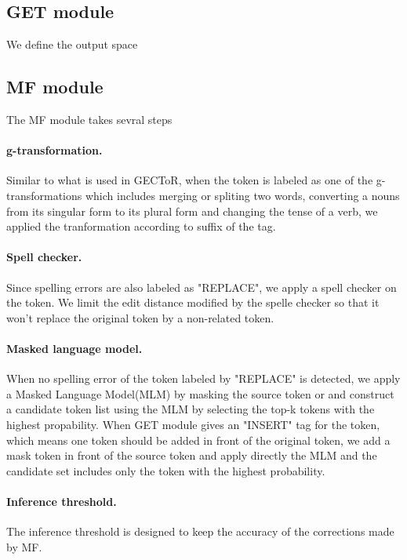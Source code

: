 \subsection{GET module} \label{sec:get_module}


We define the output space 
\subsection{MF module} \label{sec:mf_module}

The MF module takes sevral steps

\paragraph{g-transformation. } Similar to what is used in GECToR, when the token is labeled as one of the g-transformations which includes merging or spliting two words, converting a nouns from its singular form to its plural form and changing the tense of a verb, we applied the tranformation according to suffix of the tag.

\paragraph{Spell checker. } Since spelling errors are also labeled as "REPLACE", we apply a spell checker on the token. We limit the edit distance modified by the spelle checker so that it won't replace the original token by a non-related token.

\paragraph{Masked language model. } When no spelling error of the token labeled by "REPLACE" is detected, we apply a Masked Language Model(MLM) by masking the source token or and construct a candidate token list using the MLM by selecting the top-k tokens with the highest propability. When GET module gives an "INSERT" tag for the token, which means one token should be added in front of the original token, we add a mask token in front of the source token and apply directly the MLM and the candidate set includes only the token with the highest probability.

\paragraph{Inference threshold. } The inference threshold is designed to keep the accuracy of the corrections made by MF.  


